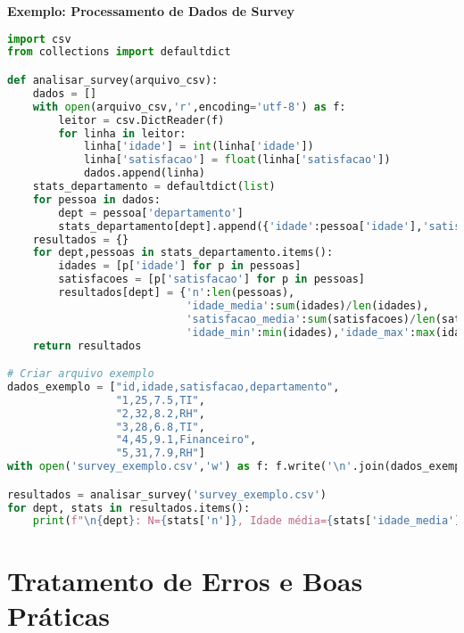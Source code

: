 \begin{examplebox}
\textbf{Exemplo: Processamento de Dados de Survey}

\begin{lstlisting}[language=Python,breaklines=true,postbreak=\mbox{\textcolor{red}{$\hookrightarrow$}\space}]
import csv
from collections import defaultdict

def analisar_survey(arquivo_csv):
    dados = []
    with open(arquivo_csv,'r',encoding='utf-8') as f:
        leitor = csv.DictReader(f)
        for linha in leitor:
            linha['idade'] = int(linha['idade'])
            linha['satisfacao'] = float(linha['satisfacao'])
            dados.append(linha)
    stats_departamento = defaultdict(list)
    for pessoa in dados:
        dept = pessoa['departamento']
        stats_departamento[dept].append({'idade':pessoa['idade'],'satisfacao':pessoa['satisfacao']})
    resultados = {}
    for dept,pessoas in stats_departamento.items():
        idades = [p['idade'] for p in pessoas]
        satisfacoes = [p['satisfacao'] for p in pessoas]
        resultados[dept] = {'n':len(pessoas),
                            'idade_media':sum(idades)/len(idades),
                            'satisfacao_media':sum(satisfacoes)/len(satisfacoes),
                            'idade_min':min(idades),'idade_max':max(idades)}
    return resultados

# Criar arquivo exemplo
dados_exemplo = ["id,idade,satisfacao,departamento",
                 "1,25,7.5,TI",
                 "2,32,8.2,RH",
                 "3,28,6.8,TI",
                 "4,45,9.1,Financeiro",
                 "5,31,7.9,RH"]
with open('survey_exemplo.csv','w') as f: f.write('\n'.join(dados_exemplo))

resultados = analisar_survey('survey_exemplo.csv')
for dept, stats in resultados.items():
    print(f"\n{dept}: N={stats['n']}, Idade média={stats['idade_media']:.1f}, Satisfação média={stats['satisfacao_media']:.1f}")
\end{lstlisting}
\end{examplebox}

\section{Tratamento de Erros e Boas Práticas}

